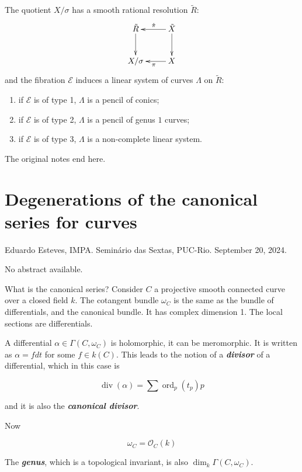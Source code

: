The quotient $X/\sigma$ has a smooth
rational resolution $\tilde{R}$:
$$
\xymatrix{
\tilde{R} \ar[d]
& \tilde{X} \ar[l]_{\hat{\pi}} \ar[d] \\
X/\sigma & X \ar[l]^{\pi}
}
$$
and the fibration $\mathcal{E}$ induces a
linear system of curves $\Lambda$ on
$\tilde{R}$:
\begin{enumerate}
\item if $\mathcal{E}$ is of type 1,
$\Lambda$ is a pencil of conics;
\item if $\mathcal{E}$ is of type 2,
$\Lambda$ is a pencil of genus $1$ curves;
\item if $\mathcal{E}$ is of type 3,
$\Lambda$ is a non-complete linear system.
\end{enumerate}
The original notes end here.



\section{Degenerations of the canonical
series for curves}
\label{section-esteves-canonical-series}

\noindent
Eduardo Esteves, IMPA.
Semin\'ario das Sextas, PUC-Rio.
September 20, 2024.

\medskip\noindent
No abstract available.

\medskip{}

\medskip{}

What is the canonical series? Consider $C$ a
projective smooth connected curve over a
closed field $k$. The cotangent bundle
$\omega_C$ is the same as the bundle of
differentials, and the canonical bundle. It
has complex dimension 1. The local sections
are differentials.

A differential $\alpha \in\Gamma(C,\omega_C)$
is holomorphic, it can be meromorphic. It is
written as $\alpha=fdt$ for some $f\in k(C)$.
This leads to the notion of a
\textit{\textbf{divisor}} of a differential,
which in this case is

$$
\operatorname{div}(\alpha)=\sum
\operatorname{ord}_p(t_p)p
$$

and it is also the \textit{\textbf{canonical
divisor}}.

Now

$$
\omega_C=\mathcal{O}_C(k)
$$

The \textit{\textbf{genus}}, which is a
topological invariant, is also
$\dim_k\Gamma(C,\omega_C)$.

